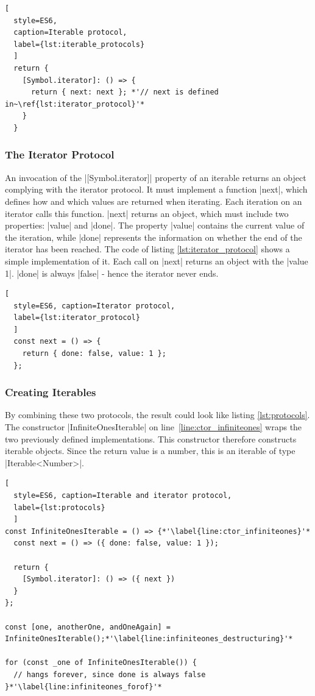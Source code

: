 \begin{lstlisting}[
  style=ES6, 
  caption=Iterable protocol,
  label={lst:iterable_protocols}
  ]
  return {
    [Symbol.iterator]: () => {
      return { next: next }; *'// next is defined in~\ref{lst:iterator_protocol}'*
    }
  }
\end{lstlisting}

\subsubsection{The Iterator Protocol}
\label{subsub:The Iterator Protocol}
An invocation of the |[Symbol.iterator]| property of an iterable returns an
object complying with the iterator protocol. It must implement a function
|next|, which defines how and which values are returned when iterating. Each
iteration on an iterator calls this function. |next| returns an object, which
must include two properties: |value| and |done|. The property |value| contains
the current value of the iteration, while |done| represents the information on
whether the end of the iterator has been reached. The code of listing
\ref{lst:iterator_protocol} shows a simple implementation of it. Each call on
|next| returns an object with the |value 1|. |done| is always |false| - hence
the iterator never ends. 

\begin{lstlisting}[
  style=ES6, caption=Iterator protocol,
  label={lst:iterator_protocol}
  ]
  const next = () => {
    return { done: false, value: 1 };
  };
\end{lstlisting}

\subsubsection{Creating Iterables}
\label{subsub:Creating Iterables}
By combining these two protocols, the result could look like listing
\ref{lst:protocols}. The constructor |InfiniteOnesIterable| on
line~\ref{line:ctor_infiniteones} wraps the two
previously defined implementations. This constructor therefore constructs
iterable objects. Since the return value is a number, this is an
iterable of type |Iterable<Number>|.

\begin{lstlisting}[
  style=ES6, caption=Iterable and iterator protocol,
  label={lst:protocols}
  ]
const InfiniteOnesIterable = () => {*'\label{line:ctor_infiniteones}'*
  const next = () => ({ done: false, value: 1 });

  return {
    [Symbol.iterator]: () => ({ next })
  }
};

const [one, anotherOne, andOneAgain] = InfiniteOnesIterable();*'\label{line:infiniteones_destructuring}'*

for (const _one of InfiniteOnesIterable()) { 
  // hangs forever, since done is always false
}*'\label{line:infiniteones_forof}'*
\end{lstlisting}

